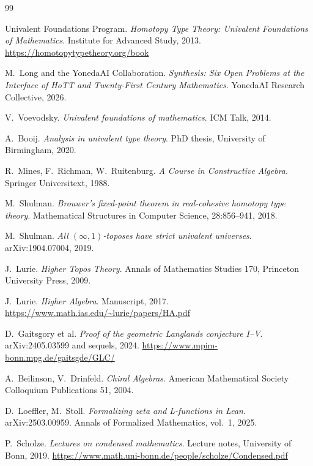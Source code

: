 \documentclass[12pt]{article}
\theoremstyle{definition}
\theoremstyle{remark}
\begin{document}

\begin{thebibliography}{99}

Univalent Foundations Program.
\textit{Homotopy Type Theory: Univalent Foundations of Mathematics}.
Institute for Advanced Study, 2013. \url{https://homotopytypetheory.org/book}

M.\ Long and the YonedaAI Collaboration.
\textit{Synthesis: Six Open Problems at the Interface of HoTT and
Twenty-First Century Mathematics}.
YonedaAI Research Collective, 2026.

V.\ Voevodsky.
\textit{Univalent foundations of mathematics}.
ICM Talk, 2014.

A.\ Booij.
\textit{Analysis in univalent type theory}.
PhD thesis, University of Birmingham, 2020.

R.\ Mines, F.\ Richman, W.\ Ruitenburg.
\textit{A Course in Constructive Algebra}.
Springer Universitext, 1988.

M.\ Shulman.
\textit{Brouwer's fixed-point theorem in real-cohesive homotopy type theory}.
Mathematical Structures in Computer Science, 28:856--941, 2018.

M.\ Shulman.
\textit{All $(\infty,1)$-toposes have strict univalent universes}.
arXiv:1904.07004, 2019.

J.\ Lurie.
\textit{Higher Topos Theory}.
Annals of Mathematics Studies 170, Princeton University Press, 2009.

J.\ Lurie.
\textit{Higher Algebra}.
Manuscript, 2017. \url{https://www.math.ias.edu/~lurie/papers/HA.pdf}

D.\ Gaitsgory et al.
\textit{Proof of the geometric Langlands conjecture I--V}.
arXiv:2405.03599 and sequels, 2024.
\url{https://www.mpim-bonn.mpg.de/gaitsgde/GLC/}

A.\ Beilinson, V.\ Drinfeld.
\textit{Chiral Algebras}.
American Mathematical Society Colloquium Publications 51, 2004.

D.\ Loeffler, M.\ Stoll.
\textit{Formalizing zeta and L-functions in Lean}.
arXiv:2503.00959. Annals of Formalized Mathematics, vol.\ 1, 2025.

P.\ Scholze.
\textit{Lectures on condensed mathematics}.
Lecture notes, University of Bonn, 2019.
\url{https://www.math.uni-bonn.de/people/scholze/Condensed.pdf}


\end{thebibliography}
\end{document}
